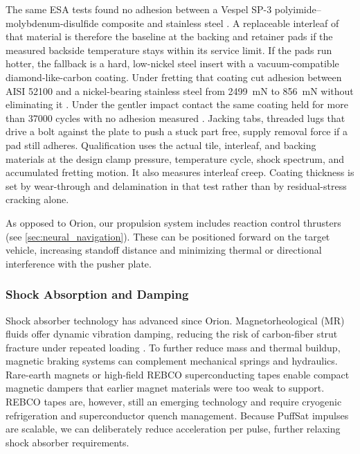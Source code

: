 \documentclass{article}
\begin{document}
The same ESA tests found no adhesion between a Vespel SP-3 polyimide--molybdenum-disulfide composite and stainless steel \cite{merstallinger_cold_welding}. A replaceable interleaf of that material is therefore the baseline at the backing and retainer pads if the measured backside temperature stays within its service limit. If the pads run hotter, the fallback is a hard, low-nickel steel insert with a vacuum-compatible diamond-like-carbon coating. Under fretting that coating cut adhesion between AISI 52100 and a nickel-bearing stainless steel from \SI{2499}{\milli\newton} to \SI{856}{\milli\newton} without eliminating it \cite{merstallinger_cold_welding}. Under the gentler impact contact the same coating held for more than \num{37000} cycles with no adhesion measured \cite{merstallinger_coatings}. Jacking tabs, threaded lugs that drive a bolt against the plate to push a stuck part free, supply removal force if a pad still adheres. Qualification uses the actual tile, interleaf, and backing materials at the design clamp pressure, temperature cycle, shock spectrum, and accumulated fretting motion. It also measures interleaf creep. Coating thickness is set by wear-through and delamination in that test rather than by residual-stress cracking alone.

As opposed to Orion, our propulsion system includes reaction control thrusters (see \autoref{sec:neural_navigation}). These can be positioned forward on the target vehicle, increasing standoff distance and minimizing thermal or directional interference with the pusher plate. 

\subsubsection{Shock Absorption and Damping}\label{sec:pusher_plate_damping}
Shock absorber technology has advanced since Orion. Magnetorheological (MR) fluids offer dynamic vibration damping, reducing the risk of carbon-fiber strut fracture under repeated loading \cite{mr_fluids}. To further reduce mass and thermal buildup, magnetic braking systems can complement mechanical springs and hydraulics. Rare-earth magnets \cite{rare_earth_braking} or high-field REBCO superconducting tapes \cite{rebco_tapes} enable compact magnetic dampers that earlier magnet materials were too weak to support. REBCO tapes are, however, still an emerging technology and require cryogenic refrigeration and superconductor quench management. Because PuffSat impulses are scalable, we can deliberately reduce acceleration per pulse, further relaxing shock absorber requirements.
\end{document}
